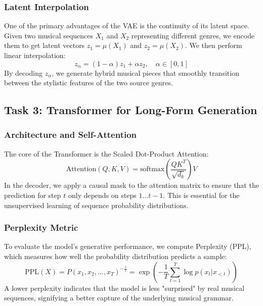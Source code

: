 \documentclass[conference]{IEEEtran}
\begin{document}

\subsubsection{Latent Interpolation}
One of the primary advantages of the VAE is the continuity of its latent space. Given two musical sequences $X_1$ and $X_2$ representing different genres, we encode them to get latent vectors $z_1 = \mu(X_1)$ and $z_2 = \mu(X_2)$. We then perform linear interpolation:
\begin{equation}
z_\alpha = (1-\alpha) z_1 + \alpha z_2, \quad \alpha \in [0, 1]
\end{equation}
By decoding $z_\alpha$, we generate hybrid musical pieces that smoothly transition between the stylistic features of the two source genres.

\subsection{Task 3: Transformer for Long-Form Generation}

\subsubsection{Architecture and Self-Attention}
The core of the Transformer is the Scaled Dot-Product Attention:
\begin{equation}
\text{Attention}(Q, K, V) = \text{softmax}\left(\frac{QK^T}{\sqrt{d_k}}\right)V
\end{equation}
In the decoder, we apply a causal mask to the attention matrix to ensure that the prediction for step $t$ only depends on steps $1 \dots t-1$. This is essential for the unsupervised learning of sequence probability distributions.


\subsubsection{Perplexity Metric}
To evaluate the model's generative performance, we compute Perplexity (PPL), which measures how well the probability distribution predicts a sample:
\begin{equation}
\text{PPL}(X) = P(x_1, x_2, \dots, x_T)^{-\frac{1}{T}} = \exp\left(-\frac{1}{T} \sum_{t=1}^T \log p(x_t|x_{<t})\right)
\end{equation}
A lower perplexity indicates that the model is less "surprised" by real musical sequences, signifying a better capture of the underlying musical grammar.
\end{document}
